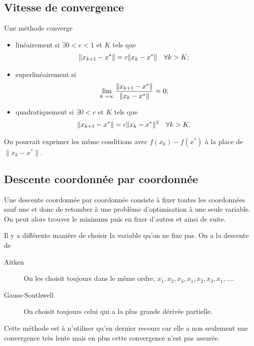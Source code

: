 \subsection{Vitesse de convergence}
Une méthode converge
\begin{itemize}
  \item linéairement si $\exists 0 < c < 1$ et $K$ tels que
    \begin{align*}
      \|x_{k+1}-x^*\| & = c\|x_{k}-x^*\| & \forall k > K;
    \end{align*}
  \item superlinéairement si
    \[ \lim_{k\to \infty} \frac{\|x_{k+1}-x^*\|}{\|x_{k}-x^*\|} = 0; \]
  \item quadratiquement si $\exists 0 < c$ et $K$ tels que
    \begin{align*}
      \|x_{k+1}-x^*\| & = c\|x_{k}-x^*\|^2 & \forall k > K.
    \end{align*}
\end{itemize}
On pourrait exprimer les même conditions avec $f(x_k)-f(x^*)$
à la place de $\|x_k-x^*\|$.

\subsection{Descente coordonnée par coordonnée}
Une descente coordonnée par coordonnée consiste à fixer toutes les coordonnées
sauf une et donc de retomber à une problème d'optimisation à une seule
variable.
On peut alors trouver le minimum puis en fixer d'autres et ainsi de suite.

Il y a différente manière de choisir la variable qu'on ne fixe pas.
On a la descente de
\begin{description}
  \item[Aitken] On les choisit toujours dans le même ordre,
    $x_1,x_2,x_3,x_1,x_2,x_3,x_1,\ldots$.
  \item[Gauss-Southwell] On choisit toujours celui qui a la plus grande
    dérivée partielle.
\end{description}

Cette méthode est à n'utiliser qu'en dernier recours car
elle a non seulement une convergence très lente mais en plus cette
convergence n'est pas assurée.

